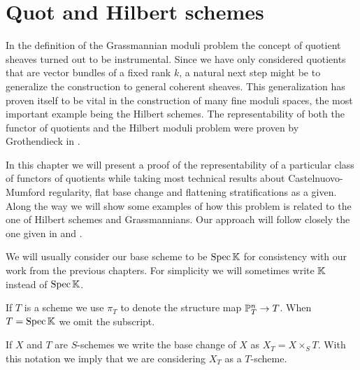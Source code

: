 \chapter{Quot and Hilbert schemes}
In the definition of the Grassmannian moduli problem the concept of quotient sheaves turned out to be instrumental. 
Since we have only considered quotients that are vector bundles of a fixed rank $k$, a natural next step might be to generalize the construction to general coherent sheaves. 
This generalization has proven itself to be vital in the construction of many fine moduli spaces, the most important example being the Hilbert schemes. 
The representability of both the functor of quotients and the Hilbert moduli problem were proven by Grothendieck in \cite{FGAVI}.

In this chapter we will present a proof of the representability of a particular class of functors of quotients while taking most technical results about Castelnuovo-Mumford regularity, flat base change and flattening stratifications as a given. 
Along the way we will show some examples of how this problem is related to the one of Hilbert schemes and Grassmannians. Our approach will follow closely the one given in \cite{Alper} and \cite{FGAEXPLAINED}.\smallskip

We will usually consider our base scheme to be $\mathrm{Spec}\, \mathbb{K}$ for consistency with our work from the previous chapters.
For simplicity we will sometimes write $\mathbb{K}$ instead of $\mathrm{Spec}\, \mathbb{K}$.
\begin{notation}
If $T$ is a scheme we use $\pi_T$ to denote the structure map $\mathbb{P}^n_T\to T$. When $T=\mathrm{Spec}\,\mathbb{K}$ we omit the subscript.
\end{notation}

\begin{notation}
If $X$ and $T$ are $S$-schemes we write the base change of $X$ as $X_T=X\times_S T$. With this notation we imply that we are considering $X_T$ as a $T$-scheme.
\end{notation}


